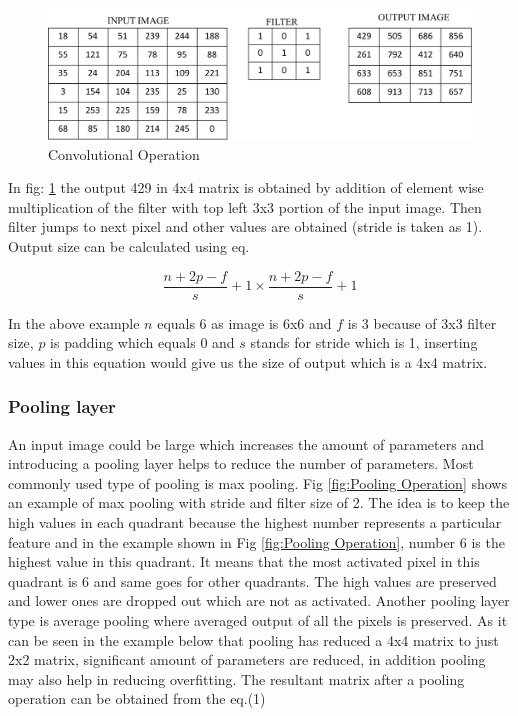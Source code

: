 \documentclass[11pt]{article}
\begin{document}
\begin{figure}[H]
	\includegraphics[width=\linewidth]{files/cnn_architecture/conv.png}
	\caption{Convolutional Operation}
	\label{fig:Convolutional Operation}
\end{figure}

In fig: \ref{fig:Convolutional Operation} the output 429 in 4x4 matrix is obtained by addition of element wise multiplication of the filter with top left 3x3 portion of the input image. Then filter jumps to next pixel and other values are obtained (stride is taken as 1). Output size can be calculated using eq.

\begin{equation}
\frac{n+2p-f}{s}+1 \times \frac{n+2p-f}{s}+1
\end{equation}

In the above example $n$ equals 6 as image is 6x6 and $f$ is 3 because of 3x3 filter size, $p$ is padding which equals 0 and $s$ stands for stride which is 1, inserting values in this equation would give us the size of output which is a 4x4 matrix.

\subsubsection{Pooling layer}
An input image could be large which increases the amount of parameters and introducing a pooling layer helps to reduce the number of parameters. Most commonly used type of pooling is max pooling. Fig \ref{fig:Pooling Operation} shows an example of max pooling with stride and filter size of 2. The idea is to keep the high values in each quadrant because the highest number represents a particular feature and in the example shown in Fig \ref{fig:Pooling Operation}, number 6 is the highest value in this quadrant. It means that the most activated pixel in this quadrant is 6 and same goes for other quadrants. The high values are preserved and lower ones are dropped out which are not as activated. Another pooling layer type is average pooling where averaged output of all the pixels is preserved. As it can be seen in the example below that pooling has reduced a 4x4 matrix to just 2x2 matrix, significant amount of parameters are reduced, in addition pooling may also help in reducing overfitting. The resultant matrix after a pooling operation can be obtained from the eq.(1) 
\end{document}

